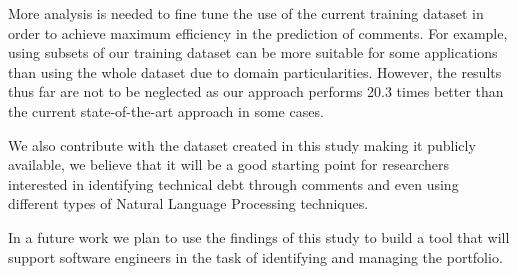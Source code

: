 More analysis is needed to fine tune the use of the current training dataset in order to achieve maximum efficiency in the prediction of \SATD comments. For example, using subsets of our training dataset can be more suitable for some applications than using the whole dataset due to domain particularities. However, the results thus far are not to be neglected as our approach performs 20.3 times   better than the current state-of-the-art approach in some cases.

We also contribute with the dataset created in this study making it publicly available, we believe that it will be a good starting point for researchers interested in identifying technical debt through comments and even using different types of Natural Language Processing techniques. 

In a future work we plan to use the findings of this study to build a tool that will support software engineers in the task of identifying and managing the \SATD portfolio. 

